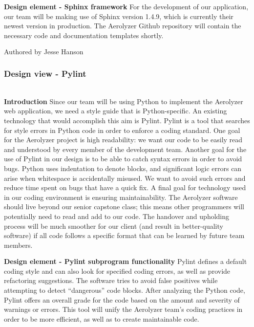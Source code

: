 \documentclass[onecolumn, draftclsnofoot,10pt, compsoc]{IEEEtran}
\begin{document}
\begin{flushleft}
\medskip

\textbf{Design element - Sphinx framework}
For the development of our application, our team will be making use of Sphinx version 1.4.9, which is currently their newest version in production. \cite{17} The Aerolyzer Github repository will contain the necessary code and documentation templates shortly.

\smallskip

\footnotesize Authored by Jesse Hanson
\normalsize

\bigskip

\subsubsection{Design view - Pylint} \ \\
\textbf{Introduction} Since our team will be using Python to implement the Aerolyzer web application, we need a style guide that is Python-specific.
An existing technology that would accomplish this aim is Pylint. Pylint is a tool that searches for style errors in Python code in order to enforce a coding standard. \cite{20} One goal for the Aerolyzer project is high readability: we want our code to be easily read and understood by every member of the development team. 
Another goal for the use of Pylint in our design is to be able to catch syntax errors in order to avoid bugs. 
Python uses indentation to denote blocks, and significant logic errors can arise when whitespace is accidentally misused. 
We want to avoid such errors and reduce time spent on bugs that have a quick fix. 
A final goal for technology used in our coding environment is ensuring maintainability. The Aerolyzer software should live beyond our senior capstone class; this means other programmers will potentially need to read and add to our code. The handover and upholding process will be much smoother for our client (and result in better-quality software) if all code follows a specific format that can be learned by future team members.

\medskip

\textbf{Design element - Pylint subprogram functionality} Pylint defines a default coding style and can also look for specified coding errors, as well as provide refactoring suggestions. 
The software tries to avoid false positives while attempting to detect “dangerous” code blocks. 
After analyzing the Python code, Pylint offers an overall grade for the code based on the amount and severity of warnings or errors. 
This tool will unify the Aerolyzer team’s coding practices in order to be more efficient, as well as to create maintainable code. 


\end{flushleft}
\end{document}
